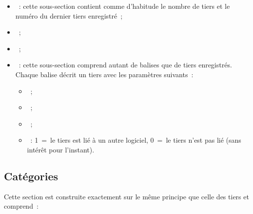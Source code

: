 \begin{itemize}

\item {}~: cette sous-section contient comme d'habitude
le nombre de tiers et le numéro du dernier tiers enregistré~;

\item {}~;

\item {}~;

\item {}~: cette sous-section comprend autant de 
balises  que de tiers enregistrés. Chaque balise décrit un tiers 
avec les paramètres suivants~:

\begin{itemize}

\item {}~;

\item {}~;

\item {}~;

\item {}~: 1~=~le tiers est lié à un autre logiciel, 0~=~le tiers 
n'est pas lié (sans intérêt pour l'instant).

\end{itemize}

\end{itemize}

\subsection{Catégories\label{xml-categories} }

Cette section est construite exactement sur le même principe que celle des tiers 
et comprend~:

